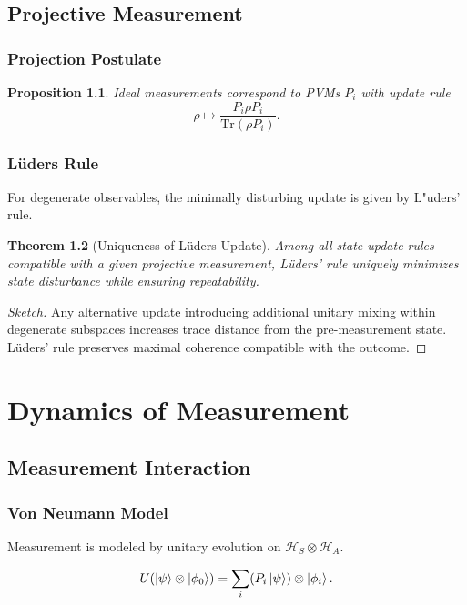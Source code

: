 \documentclass[12pt]{book}
\theoremstyle{plain}
\newtheorem{theorem}{Theorem}[chapter]
\newtheorem{proposition}[theorem]{Proposition}
\theoremstyle{definition}
\theoremstyle{remark}
\begin{document}
\chapter{Projective Measurement}

\section{Projection Postulate}

\begin{proposition}
Ideal measurements correspond to PVMs ${P_i}$ with update rule
\[
\rho \mapsto \frac{P_i \rho P_i}{\mathrm{Tr}(\rho P_i)}.
\]
\end{proposition}

\section{L\"uders Rule}
For degenerate observables, the minimally disturbing update is given by L"uders' rule.

\begin{theorem}[Uniqueness of L\"uders Update]
Among all state-update rules compatible with a given projective measurement, L\"uders' rule uniquely minimizes state disturbance while ensuring repeatability.
\end{theorem}

\begin{proof}[Sketch]
Any alternative update introducing additional unitary mixing within degenerate subspaces increases trace distance from the pre-measurement state. L\"uders' rule preserves maximal coherence compatible with the outcome.
\end{proof}

\part{Dynamics of Measurement}

\chapter{Measurement Interaction}

\section{Von Neumann Model}
Measurement is modeled by unitary evolution on $\mathcal{H}_S \otimes \mathcal{H}_A$.

\begin{equation}
U(\ket{\psi}\otimes\ket{\phi_0}) = \sum_i (P_i \ket{\psi}) \otimes \ket{\phi_i}.
\end{equation}
\end{document}
